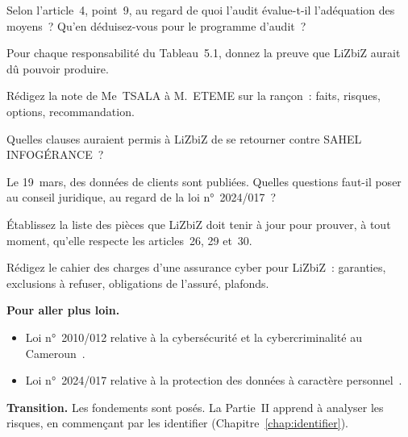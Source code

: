 \begin{boxexo}[title={\ding{45}\quad Exercice~5.4. La définition \niveaumoyen}]
Selon l'article~4, point~9, au regard de quoi l'audit évalue-t-il
l'adéquation des moyens~? Qu'en déduisez-vous pour le programme d'audit~?
\end{boxexo}

\begin{boxexo}[title={\ding{45}\quad Exercice~5.5. Responsabilités \niveaumoyen}]
Pour chaque responsabilité du Tableau~5.1, donnez la preuve que LiZbiZ
aurait dû pouvoir produire.
\end{boxexo}

\begin{boxexo}[title={\ding{45}\quad Exercice~5.6. La rançon \niveaumoyen}]
Rédigez la note de Me~TSALA à M.~ETEME sur la rançon~: faits, risques,
options, recommandation.
\end{boxexo}

\begin{boxexo}[title={\ding{45}\quad Exercice~5.7. Le contrat \niveaumoyen}]
Quelles clauses auraient permis à LiZbiZ de se retourner contre SAHEL
INFOGÉRANCE~?
\end{boxexo}

\begin{boxexo}[title={\ding{45}\quad Exercice~5.8. Données personnelles \niveaumoyen}]
Le 19~mars, des données de clients sont publiées. Quelles questions faut-il
poser au conseil juridique, au regard de la loi n°~2024/017~?
\end{boxexo}

\begin{boxexo}[title={\ding{45}\quad Exercice~5.9. Le dossier \niveauexpert}]
Établissez la liste des pièces que LiZbiZ doit tenir à jour pour prouver,
à tout moment, qu'elle respecte les articles~26, 29 et~30.
\end{boxexo}

\begin{boxexo}[title={\ding{45}\quad Exercice~5.10. L'assurance \niveauexpert}]
Rédigez le cahier des charges d'une assurance cyber pour LiZbiZ~: garanties,
exclusions à refuser, obligations de l'assuré, plafonds.
\end{boxexo}

\bigskip

\begin{boxinfo}
\textbf{Pour aller plus loin.}
\begin{itemize}
    \item Loi n°~2010/012 relative à la cybersécurité et la cybercriminalité
          au Cameroun~\cite{loi2010012}.
    \item Loi n°~2024/017 relative à la protection des données à caractère
          personnel~\cite{loi2024017}.
\end{itemize}
\end{boxinfo}

\begin{boxinfo}
\textbf{Transition.} Les fondements sont posés. La Partie~II apprend à
analyser les risques, en commençant par les identifier
(Chapitre~\ref{chap:identifier}).
\end{boxinfo}
